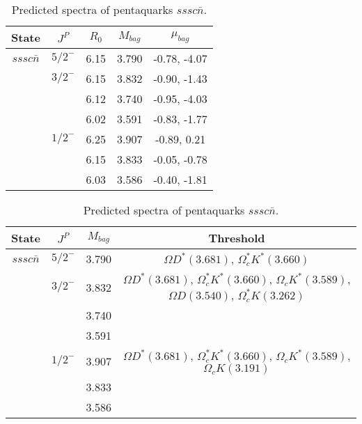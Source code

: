 \documentclass[prd,twocolumn,floatfix,nofootinbib]{revtex4}
\begin{document}
\renewcommand{\tabcolsep}{0.5cm}
\renewcommand{\arraystretch}{1.2}
\begin{table*}[!htbp]
    \caption{Predicted spectra of pentaquarks $sssc\bar{n}$.}
    \begin{tabular}{ccccc}
        \hline\hline
        {\rm State} &$J^{P}$ &$R_{0}$ &$M_{bag}$ &$\mu_{bag}$ \\ \hline
        $sssc\bar{n}$
            &${5/2}^{-}$    &6.15   &3.790  &-0.78, -4.07 \\
            &${3/2}^{-}$    &6.15   &3.832  &-0.90, -1.43 \\
            &               &6.12   &3.740  &-0.95, -4.03 \\
            &               &6.02   &3.591  &-0.83, -1.77 \\
            &${1/2}^{-}$    &6.25   &3.907  &-0.89, 0.21 \\
            &               &6.15   &3.833  &-0.05, -0.78 \\
            &               &6.03   &3.586  &-0.40, -1.81 \\
        
        \hline\hline
    \end{tabular}
\end{table*}

\renewcommand{\tabcolsep}{0.5cm}
\renewcommand{\arraystretch}{1.2}
\begin{table*}[!htbp]
    \caption{Predicted spectra of pentaquarks $sssc\bar{n}$.}
    \begin{tabular}{cccc}
        \hline\hline
        {\rm State} &$J^{P}$ &$M_{bag}$ &Threshold \\ \hline
        $sssc\bar{n}$
            &${5/2}^{-}$    &3.790  &$\Omega D^{\ast}(3.681)$, $\Omega_{c}^{\ast}K^{\ast}(3.660)$ \\
            &${3/2}^{-}$    &3.832  &$\Omega D^{\ast}(3.681)$, $\Omega_{c}^{\ast}K^{\ast}(3.660)$, $\Omega_{c}K^{\ast}(3.589)$, $\Omega D(3.540)$, $\Omega_{c}^{\ast}K(3.262)$ \\
            &               &3.740  & \\
            &               &3.591  & \\
            &${1/2}^{-}$    &3.907  &$\Omega D^{\ast}(3.681)$, $\Omega_{c}^{\ast}K^{\ast}(3.660)$, $\Omega_{c}K^{\ast}(3.589)$, $\Omega_{c}K(3.191)$ \\
            &               &3.833  & \\
            &               &3.586  & \\
        
        \hline\hline
    \end{tabular}
\end{table*}
\end{document}
